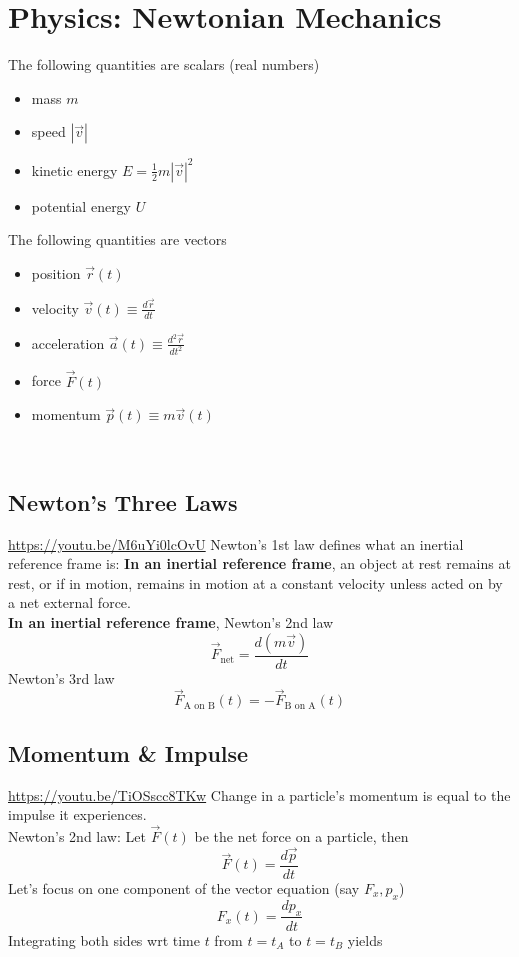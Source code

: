 \documentclass{article}
\begin{document}
\section{Physics: Newtonian Mechanics}
The following quantities are scalars (real numbers)
\begin{itemize}
    \item mass $m$
    \item speed $|\vec{v}|$
    \item kinetic energy $E = \frac{1}{2} m|\vec{v}|^2$
    \item potential energy $U$
\end{itemize}
The following quantities are vectors
\begin{itemize}
    \item position $\vec{r}(t)$
    \item velocity $\vec{v}(t) \equiv \frac{d\vec{r}}{dt}$
    \item acceleration $\vec{a}(t) \equiv \frac{d^2\vec{r}}{dt^2}$
    \item force $\vec{F}(t)$
    \item momentum $\vec{p}(t) \equiv m\vec{v}(t)$
\end{itemize}
\leavevmode \\
\subsection{Newton's Three Laws}
\url{https://youtu.be/M6uYi0lcOvU}
Newton's 1st law defines what an inertial reference frame is: \textbf{In an inertial reference frame}, an object at rest remains at rest, or if in motion, remains in motion at a constant velocity unless acted on by a net external force.\\[10pt]
\textbf{In an inertial reference frame}, Newton's 2nd law
$$\vec{F}_{\text{net}} = \frac{d(m\vec{v})}{dt}$$
Newton's 3rd law 
$$\vec{F}_{\text{A on B}}(t) = -\vec{F}_{\text{B on A}}(t)$$

\subsection{Momentum \& Impulse}
\url{https://youtu.be/TiOSscc8TKw}
Change in a particle's momentum is equal to the impulse it experiences. \\[10pt]
Newton's 2nd law: Let $\vec{F}(t)$ be the net force on a particle, then
$$\vec{F}(t) = \frac{d\vec{p}}{dt}$$
Let's focus on one component of the vector equation (say $F_x, p_x$)
$$F_x(t) = \frac{dp_x}{dt}$$
Integrating both sides wrt time $t$ from $t=t_A$ to $t=t_B$ yields
\end{document}
